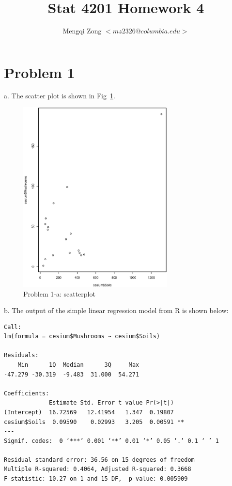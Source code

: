 \documentclass[12pt]{article}
\title{Stat 4201 Homework 4}
\author{Mengqi Zong $<mz2326@columbia.edu>$}
\begin{document}
\maketitle

\setlength{\parindent}{0in}

\section*{Problem 1}

a. The scatter plot  is shown in Fig~\ref{fig:scatter}.\\

\begin{figure}[ht!]
  \centering
  \includegraphics[width=0.7\textwidth]{scatterplot}
  \caption{Problem 1-a: scatterplot \label{fig:scatter}}
\end{figure}

b. The output of the simple linear regression model from R is shown
below:

\begin{verbatim}
Call:
lm(formula = cesium$Mushrooms ~ cesium$Soils)

Residuals:
    Min      1Q  Median      3Q     Max 
-47.279 -30.319  -9.483  31.000  54.271 

Coefficients:
             Estimate Std. Error t value Pr(>|t|)   
(Intercept)  16.72569   12.41954   1.347  0.19807   
cesium$Soils  0.09590    0.02993   3.205  0.00591 **
---
Signif. codes:  0 ‘***’ 0.001 ‘**’ 0.01 ‘*’ 0.05 ‘.’ 0.1 ‘ ’ 1 

Residual standard error: 36.56 on 15 degrees of freedom
Multiple R-squared: 0.4064,	Adjusted R-squared: 0.3668 
F-statistic: 10.27 on 1 and 15 DF,  p-value: 0.005909 
\end{verbatim}
\end{document}
